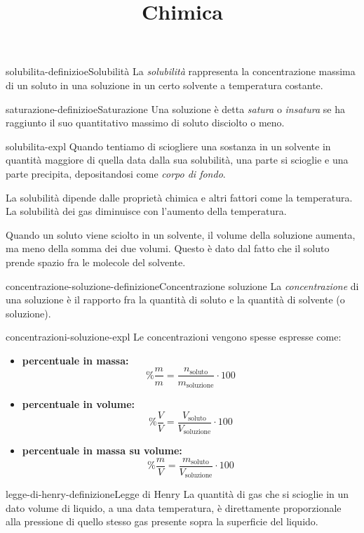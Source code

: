 \documentclass[preview]{standalone}
\begin{document}
\title{Chimica}
\genpage

\begin{snippetdefinition}{solubilita-definizioe}{Solubilità}
    La \textit{solubilità} rappresenta la concentrazione massima di un soluto
    in una soluzione in un certo solvente a temperatura costante.
\end{snippetdefinition}

\begin{snippetdefinition}{saturazione-definizioe}{Saturazione}
    Una soluzione è detta \textit{satura} o \textit{insatura}
    se ha raggiunto il suo quantitativo massimo di soluto disciolto o meno.
\end{snippetdefinition}

\begin{snippet}{solubilita-expl}
    Quando tentiamo di sciogliere una sostanza in un solvente in quantità maggiore
    di quella data dalla sua solubilità, una parte si scioglie e una parte precipita,
    depositandosi come \textit{corpo di fondo}.

    La solubilità dipende dalle proprietà chimica e altri fattori come la temperatura. \\
    La solubilità dei gas diminuisce con l'aumento della temperatura.

    Quando un soluto viene sciolto in un solvente, il volume della soluzione aumenta,
    ma meno della somma dei due volumi. Questo è dato dal fatto che il soluto prende spazio fra le molecole del solvente.
\end{snippet}

\begin{snippetdefinition}{concentrazione-soluzione-definizione}{Concentrazione soluzione}
    La \textit{concentrazione} di una soluzione è il rapporto
    fra la quantità di soluto e la quantità di solvente (o soluzione).
\end{snippetdefinition}

\begin{snippet}{concentrazioni-soluzione-expl}
    Le concentrazioni vengono spesse espresse come:
    \begin{itemize}
        \item \textbf{percentuale in massa: }
        \[\%\frac{m}{m} = \frac{n_{\text{soluto}}}{m_{\text{soluzione}}}\cdot100\]
    
        \item \textbf{percentuale in volume: }
        \[\%\frac{V}{V} = \frac{V_{\text{soluto}}}{V_{\text{soluzione}}}\cdot100\]
    
        \item \textbf{percentuale in massa su volume: }
        \[\%\frac{m}{V} = \frac{m_{\text{soluto}}}{V_{\text{soluzione}}}\cdot100\]
    \end{itemize}
\end{snippet}

\begin{snippetdefinition}{legge-di-henry-definizione}{Legge di Henry}
    La quantità di gas che si scioglie in un dato volume di liquido, a una data temperatura, è direttamente
    proporzionale alla pressione di quello stesso gas presente sopra la superficie del liquido.
\end{snippetdefinition}
\end{document}
